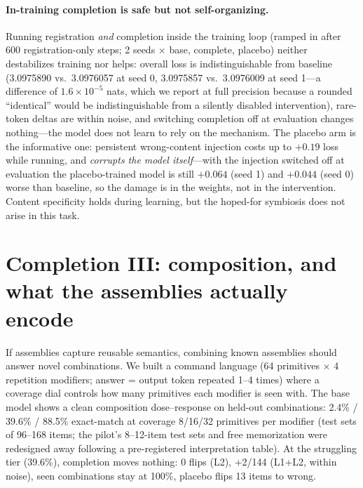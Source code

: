 \documentclass[11pt]{article}
\begin{document}
\paragraph{In-training completion is safe but not self-organizing.} Running
registration \emph{and} completion inside the training loop (ramped in after
600 registration-only steps; 2 seeds $\times$ base, complete, placebo) neither
destabilizes training nor helps: overall loss is indistinguishable from
baseline (3.0975890 vs.\ 3.0976057 at seed 0, 3.0975857 vs.\ 3.0976009 at
seed 1---a difference of $1.6\times10^{-5}$ nats, which we report at full
precision because a rounded ``identical'' would be indistinguishable from a
silently disabled intervention), rare-token deltas are within noise, and switching
completion off at evaluation changes nothing---the model does not learn to
rely on the mechanism. The placebo arm is the informative one: persistent
wrong-content injection costs up to $+0.19$ loss while running, and
\emph{corrupts the model itself}---with the injection switched off at
evaluation the placebo-trained model is still $+0.064$ (seed 1) and $+0.044$
(seed 0) worse than baseline, so the damage is in the weights, not in the
intervention. Content specificity holds during learning, but the hoped-for
symbiosis does not arise in this task.

\section{Completion III: composition, and what the assemblies actually encode}
\label{sec:compose}

If assemblies capture reusable semantics, combining known assemblies should
answer novel combinations. We built a command language (64 primitives
$\times$ 4 repetition modifiers; answer = output token repeated 1--4 times)
where a coverage dial controls how many primitives each modifier is seen with.
The base model shows a clean composition dose--response on held-out
combinations: 2.4\% / 39.6\% / 88.5\% exact-match at coverage 8/16/32
primitives per modifier (test sets of 96--168 items; the pilot's 8--12-item
test sets and free memorization were redesigned away following a
pre-registered interpretation table). At the struggling tier (39.6\%),
completion moves nothing: 0 flips (L2), +2/144 (L1+L2, within noise), seen
combinations stay at 100\%, placebo flips 13 items to wrong.
\end{document}

